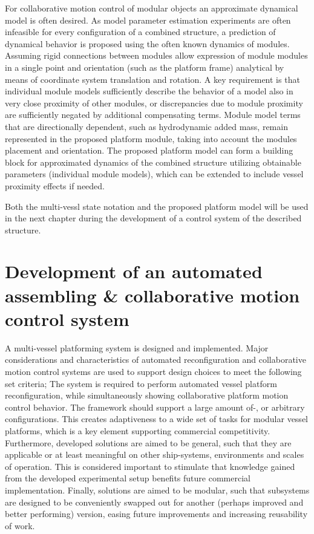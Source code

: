 For collaborative motion control of modular objects an approximate dynamical model is often desired. As model parameter estimation experiments are often infeasible for every configuration of a combined structure, a prediction of dynamical behavior is proposed using the often known dynamics of modules. Assuming rigid connections between modules allow expression of module modules in a single point and orientation (such as the platform frame) analytical by means of coordinate system translation and rotation. A key requirement is that individual module models sufficiently describe the behavior of a model also in very close proximity of other modules, or discrepancies due to module proximity are sufficiently negated by additional compensating terms. Module model terms that are directionally dependent, such as hydrodynamic added mass, remain represented in the proposed platform module, taking into account the modules placement and orientation. The proposed platform model can form a building block for approximated dynamics of the combined structure utilizing obtainable parameters (individual module models), which can be extended to include vessel proximity effects if needed. 

Both the multi-vessl state notation and the proposed platform model will be used in the next chapter during the development of a control system of the described structure. 

\section*{Development of an automated assembling \& collaborative motion control system}
A multi-vessel platforming system is designed and implemented. Major considerations and characteristics of automated reconfiguration and collaborative motion control systems are used to support design choices to meet the following set criteria; The system is required to perform automated vessel platform reconfiguration, while simultaneously showing collaborative platform motion control behavior. The framework should support a large amount of-, or arbitrary  configurations.  This creates adaptiveness to a wide set of tasks for modular vessel platforms, which is a key element supporting commercial competitivity. Furthermore, developed solutions are aimed to be general, such that they are applicable or at least meaningful on other ship-systems, environments and scales of operation. This is considered important to stimulate that knowledge gained from the developed experimental setup benefits future commercial implementation. Finally, solutions are aimed to be modular, such that subsystems are designed to be conveniently swapped out for another (perhaps improved and better performing) version, easing future improvements and increasing reusability of work.

